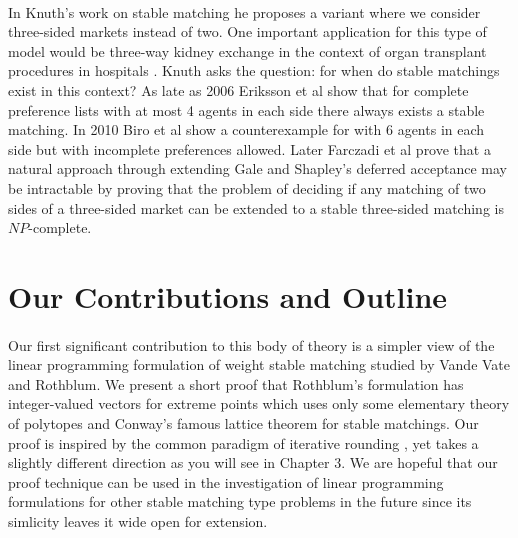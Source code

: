 \paragraph{}
In Knuth's work on stable matching he proposes a variant where we consider three-sided markets instead of two. One important application for this type of model would be three-way kidney exchange in the context of organ transplant procedures in hospitals \cite{saidman2006increasing}. Knuth asks the question: for when do stable matchings exist in this context? As late as 2006 Eriksson et al \cite{eriksson2006three} show that for complete preference lists with at most 4 agents in each side there always exists a stable matching. In 2010 Biro et al \cite{biro2010three} show a counterexample for with 6 agents in each side but with incomplete preferences allowed. Later Farczadi et al \cite{farczadi2014stable} prove that a natural approach through extending Gale and Shapley's deferred acceptance may be intractable by proving that the problem of deciding if any matching of two sides of a three-sided market can be extended to a stable three-sided matching is $NP$-complete.

\section{Our Contributions and Outline}

\paragraph{}
Our first significant contribution to this body of theory is a simpler view of the linear programming formulation of weight stable matching studied by Vande Vate and Rothblum. We present a short proof that Rothblum's formulation has integer-valued vectors for extreme points which uses only some elementary theory of polytopes and Conway's famous lattice theorem for stable matchings. Our proof is inspired by the common paradigm of iterative rounding \cite{lau2011iterative}, yet takes a slightly different direction as you will see in Chapter $3$. We are hopeful that our proof technique can be used in the investigation of linear programming formulations for other stable matching type problems in the future since its simlicity leaves it wide open for extension.
